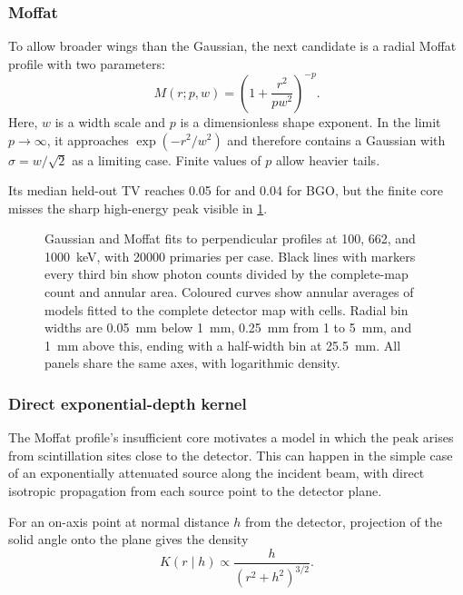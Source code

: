 \subsubsection{Moffat}

To allow broader wings than the Gaussian, the next candidate is a radial Moffat profile with two parameters:
\begin{equation}
  M(r;p,w)=\left(1+\frac{r^2}{pw^2}\right)^{-p}.
\end{equation}
Here, $w$ is a width scale and $p$ is a dimensionless shape exponent.
In the limit $p\to\infty$, it approaches $\exp(-r^2/w^2)$ and therefore contains a Gaussian with $\sigma=w/\sqrt{2}$ as a limiting case. Finite values of $p$ allow heavier tails.

Its median held-out TV reaches 0.05 for  and 0.04 for BGO, but the finite core misses the sharp high-energy peak visible in \cref{fig:gaussian-moffat}.


\begin{figure}[!htbp]
  \centering
  \captionsetup{font=small}
  \caption{Gaussian and Moffat fits to perpendicular  profiles at 100, 662, and \qty{1000}{\kilo\electronvolt}, with \num{20000} primaries per case. Black lines with markers every third bin show photon counts divided by the complete-map count and annular area. Coloured curves show annular averages of models fitted to the complete detector map with  cells. Radial bin widths are \qty{0.05}{\milli\metre} below \qty{1}{\milli\metre}, \qty{0.25}{\milli\metre} from 1 to \qty{5}{\milli\metre}, and \qty{1}{\milli\metre} above this, ending with a half-width bin at \qty{25.5}{\milli\metre}. All panels share the same axes, with logarithmic density.}
  \label{fig:gaussian-moffat}
\end{figure}
\FloatBarrier

\subsubsection{Direct exponential-depth kernel}

The Moffat profile's insufficient core motivates a model in which the peak arises from scintillation sites close to the detector. This can happen in the simple case of an exponentially attenuated source along the incident beam, with direct isotropic propagation from each source point to the detector plane.

For an on-axis point at normal distance $h$ from the detector, projection of the solid angle onto the plane gives the density
\begin{equation}
  K(r\mid h)\propto\frac{h}{(r^2+h^2)^{3/2}}.
\end{equation}

